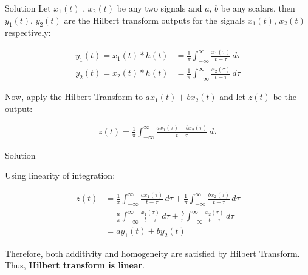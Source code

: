 \documentclass{beamer}
\begin{document}
\begin{frame}{Solution}
Let $x_1(t)$ , $x_2(t)$ be any two signals and $a$, $b$ be any scalars, 
then $y_1(t)$, $y_2(t)$ are the Hilbert transform outputs for the signals 
$x_1(t)$, $x_2(t)$ respectively:

\begin{align}
    y_1(t) = x_1(t) * h(t) &= \frac{1}{\pi} \int_{-\infty}^{\infty} 
    \frac{x_1(\tau)}{t - \tau} \, d\tau \\[4pt]
    y_2(t) = x_2(t) * h(t) &= \frac{1}{\pi} \int_{-\infty}^{\infty} 
    \frac{x_2(\tau)}{t - \tau} \, d\tau
\end{align}

Now, apply the Hilbert Transform to $ax_1(t) + bx_2(t)$ 
and let $z(t)$ be the output:

\begin{align}
    z(t) = \frac{1}{\pi} \int_{-\infty}^{\infty} 
    \frac{ax_1(\tau) + bx_2(\tau)}{t - \tau} \, d\tau
\end{align}

\end{frame}

\begin{frame}{Solution}

Using linearity of integration:

\begin{align}
z(t) &= \frac{1}{\pi} \int_{-\infty}^{\infty} \frac{ax_1(\tau)}{t - \tau} \, d\tau 
     + \frac{1}{\pi} \int_{-\infty}^{\infty} \frac{bx_2(\tau)}{t - \tau} \, d\tau \\[4pt]
     &= \frac{a}{\pi} \int_{-\infty}^{\infty} \frac{x_1(\tau)}{t - \tau} \, d\tau 
     + \frac{b}{\pi} \int_{-\infty}^{\infty} \frac{x_2(\tau)}{t - \tau} \, d\tau \\
     &= ay_1(t) + by_2(t)
\end{align}

Therefore, both additivity and homogeneity are satisfied by Hilbert Transform.
Thus, \textbf{Hilbert transform is linear}.

\end{frame}
\end{document}
